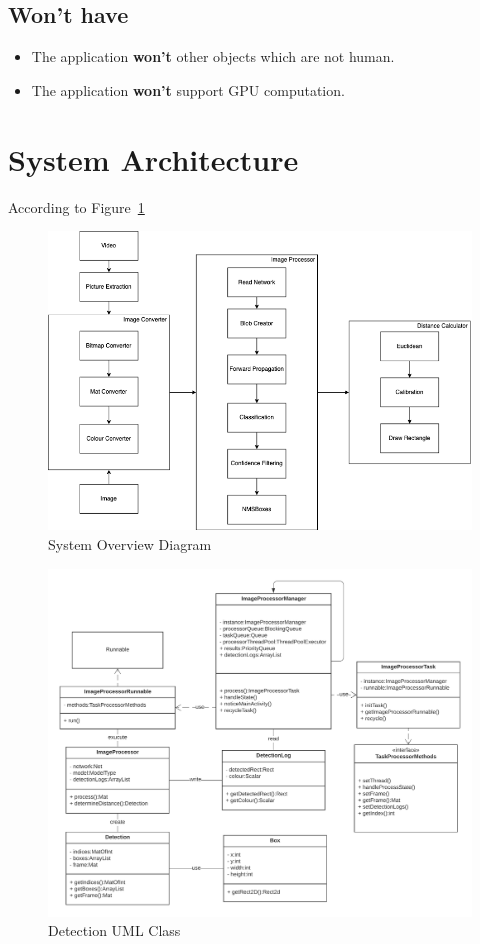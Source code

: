     \subsection{Won't have}
        \begin{itemize}
            \item The application \textbf{won't} other objects which are not human.
            \item The application \textbf{won't} support GPU computation.
        \end{itemize}


\section{System Architecture}
    According to Figure~\ref{systemOverview}

    \begin{figure}[!ht]
        \includegraphics[width=6in]{images/chapter3/system-overview.png}
        \caption{System Overview Diagram}
        \label{systemOverview}
    \end{figure}

    \begin{figure}[!ht]
        \includegraphics[width=6in]{images/chapter3/detection-uml.png}
        \caption{Detection UML Class}
        \label{detectionUml}
    \end{figure}

